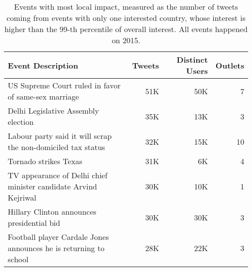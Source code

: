 \begin{table}[]
\caption{Events with most local impact, measured as the number of tweets coming from events with only one interested country, whose interest is higher than the 99-th percentile of overall interest. All events happened on 2015.}\label{tab:impact_local}
\centering
{\scriptsize
\begin{tabularx}{\textwidth}{@{}lrrr@{}}
\toprule
Event Description                                                 & Tweets & Distinct Users & Outlets \\ \midrule
US Supreme Court ruled in favor of same-sex marriage              & 51K  & 50K          & 7                                    \\
Delhi Legislative Assembly election                               & 35K  & 13K          & 3                                  \\
Labour party said it will scrap the non-domiciled tax status      & 32K  & 15K          & 10                           \\
Tornado strikes Texas                                             & 31K  & 6K           & 4                                    \\
TV appearance of Delhi chief minister candidate Arvind Kejriwal   & 30K  & 10K          & 1                                    \\
Hillary Clinton announces presidential bid                        & 30K  & 30K          & 3                                     \\
Football player Cardale Jones announces he is returning to school & 28K  & 22K          & 3                                      \\ \bottomrule
\end{tabularx}
}
\end{table}



